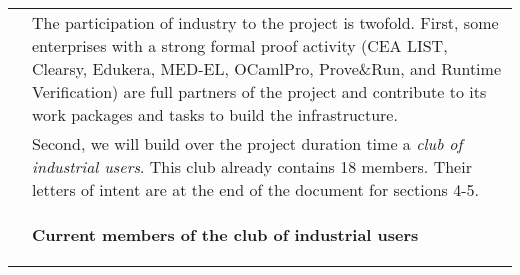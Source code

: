\begin{longtable}{|p{}|p{}|}
&
\hspace{0.4cm}
The participation of industry to the project is twofold. First,
some enterprises with a strong formal proof activity (CEA
LIST, Clearsy, Edukera, MED-EL, OCamlPro, Prove\&Run, 
and Runtime Verification) are full partners of the project and
contribute to its work packages and tasks to build the
infrastructure.
\\
&
\hspace{0.4cm}
Second, we will build over the project duration time a {\em club of
  industrial users}. This club already contains
18 members.
Their letters of intent are at the end of the document for sections 4-5.
\\
&
\hspace{0.4cm}
\definecolor{shadecolor}{named}{color1}
\begin{shaded}
\begin{center}
  {\bf\large Current members of the club of industrial users}


\end{center}
\end{shaded}
\end{longtable}
